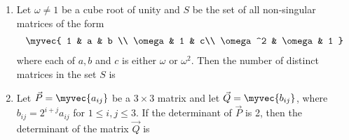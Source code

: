 \begin{enumerate}
\begin{enumerate}
                \end{enumerate}
            \item Let $\omega \neq 1$ be a cube root of unity and $S$ be the set of all non-singular matrices of the form 
                \begin{align*}
                    \myvec{
                        1 & a & b \\
                        \omega & 1 & c\\
                        \omega^2 & \omega & 1
                    }
                \end{align*} where each of $a,b$ and $c$ is either $\omega$ or $\omega^2$. Then the number of distinct matrices in the set $S$ is
                \hfill{}

                \begin{enumerate}

                \end{enumerate}

            \item Let $\vec{P} = \myvec{a_{ij}}$ be a $3 \times 3$ matrix and let $\vec{Q} =  \myvec{b_{ij}}$, where $b_{ij} = 2^{i+j}a_{ij}$ for $1 \le i,j \le 3$. If the determinant of $\vec{P}$ is 2, then the determinant of the matrix $\vec{Q}$ is 
                \hfill{}
                \begin{enumerate}

                \end{enumerate}


\end{enumerate}

